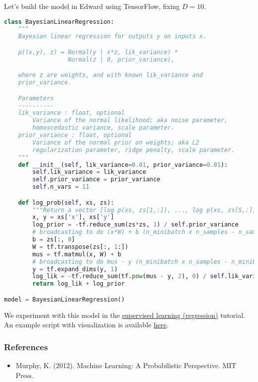 Let's build the model in Edward using TensorFlow, fixing $D=10$.
\begin{lstlisting}[language=Python]
class BayesianLinearRegression:
    """
    Bayesian linear regression for outputs y on inputs x.

    p((x,y), z) = Normal(y | x*z, lik_variance) *
                  Normal(z | 0, prior_variance),

    where z are weights, and with known lik_variance and
    prior_variance.

    Parameters
    ----------
    lik_variance : float, optional
        Variance of the normal likelihood; aka noise parameter,
        homoscedastic variance, scale parameter.
    prior_variance : float, optional
        Variance of the normal prior on weights; aka L2
        regularization parameter, ridge penalty, scale parameter.
    """
    def __init__(self, lik_variance=0.01, prior_variance=0.01):
        self.lik_variance = lik_variance
        self.prior_variance = prior_variance
        self.n_vars = 11

    def log_prob(self, xs, zs):
        """Return a vector [log p(xs, zs[1,:]), ..., log p(xs, zs[S,:])]."""
        x, y = xs['x'], xs['y']
        log_prior = -tf.reduce_sum(zs*zs, 1) / self.prior_variance
        # broadcasting to do (x*W) + b (n_minibatch x n_samples - n_samples)
        b = zs[:, 0]
        W = tf.transpose(zs[:, 1:])
        mus = tf.matmul(x, W) + b
        # broadcasting to do mus - y (n_minibatch x n_samples - n_minibatch x 1)
        y = tf.expand_dims(y, 1)
        log_lik = -tf.reduce_sum(tf.pow(mus - y, 2), 0) / self.lik_variance
        return log_lik + log_prior

model = BayesianLinearRegression()
\end{lstlisting}

We experiment with this model in the \href{tut_supervised_regression}{supervised
learning (regression)} tutorial.
An example script with visualization is available
\href{https://github.com/blei-lab/edward/blob/master/examples/bayesian_linear_regression_plot.py}
{here}.

\subsubsection{References}\label{references}

\begin{itemize}
\item
  Murphy, K. (2012). Machine Learning: A Probabilistic Perspective. MIT Press.
\end{itemize}
